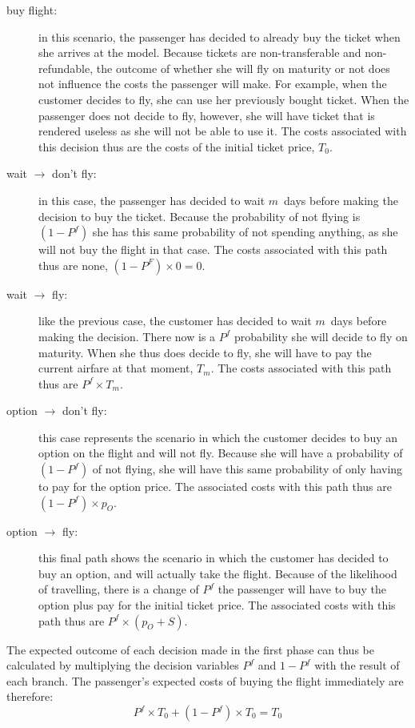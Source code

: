 \begin{description}
\item[buy flight:] in this scenario, the passenger has decided to already buy the ticket when she arrives at the model. Because tickets are non-transferable and non-refundable, the outcome of whether she will fly on maturity or not does not influence the costs the passenger will make. For example, when the customer decides to fly, she can use her previously bought ticket. When the passenger does not decide to fly, however, she will have ticket that is rendered useless as she will not be able to use it. The costs associated with this decision thus are the costs of the initial ticket price, $T_0$.

\item[wait $\rightarrow$ don't fly:] in this case, the passenger has decided to wait $m$~days before making the decision to buy the ticket. Because the probability of not flying is $(1 - P^f)$ she has this same probability of not spending anything, as she will not buy the flight in that case. The costs associated with this path thus are none, $(1 - P^F) \times 0 = 0$.

\item[wait $\rightarrow$ fly:] like the previous case, the customer has decided to wait $m$~days before making the decision. There now is a $P^f$ probability she will decide to fly on maturity. When she thus does decide to fly, she will have to pay the current airfare at that moment, $T_m$. The costs associated with this path thus are $P^f \times T_m$.

\item[option $\rightarrow$ don't fly:] this case represents the scenario in which the customer decides to buy an option on the flight and will not fly. Because she will have a probability of $(1 - P^f)$ of not flying, she will have this same probability of only having to pay for the option price. The associated costs with this path thus are $(1 - P^f) \times p_O$.

\item[option $\rightarrow$ fly:] this final path shows the scenario in which the customer has decided to buy an option, and will actually take the flight. Because of the likelihood of travelling, there is a change of $P^f$ the passenger will have to buy the option plus pay for the initial ticket price. The associated costs with this path thus are $P^f \times (p_O + S)$.
\end{description}


The expected outcome of each decision made in the first phase can thus be calculated by multiplying the decision variables $P^f$ and $1 - P^f$ with the result of each branch. The passenger's expected costs of buying the flight immediately are therefore:
\begin{equation*}
P^f \times T_0 + (1 - P^f) \times T_0 = T_0
\end{equation*}

